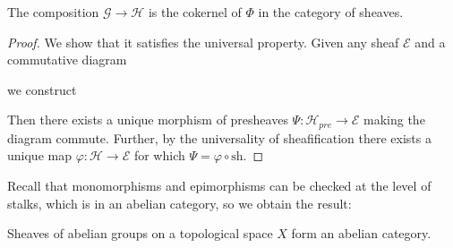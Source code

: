 \begin{proposition}
    The composition $\mathscr{G}\rightarrow \mathscr{H}$ is the cokernel of $\Phi$ in the category of sheaves.
\end{proposition}
\begin{proof}
    We show that it satisfies the universal property. Given any sheaf $\mathscr{E}$ and a commutative diagram 
    \begin{center}
    \end{center}
    we construct
    \begin{center}
    \end{center}
    Then there exists a unique morphism of presheaves $\Psi:\mathscr{H}_{pre}\rightarrow \mathscr{E}$ making the diagram commute. Further, by the universality of sheafification there exists a unique map $\varphi:\mathscr{H}\rightarrow \mathscr{E}$ for which $\Psi = \varphi \circ\text{sh}$.
\end{proof}

Recall that monomorphisms and epimorphisms can be checked at the level of stalks, which is in an abelian category, so we obtain the result:

\begin{theorem}
    Sheaves of abelian groups on a topological space $X$ form an abelian category.
\end{theorem}

